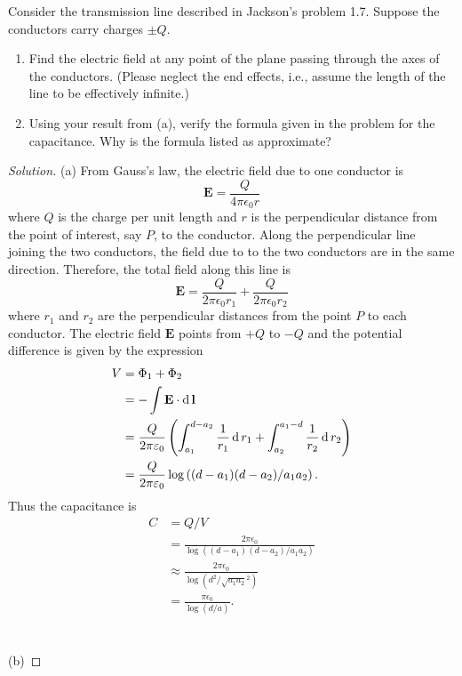 \begin{problem}
Consider the transmission line described in Jackson's problem
1.7. Suppose the conductors carry charges $\pm Q$.
 \begin{enumerate}[noitemsep,label=(\alph*)]
\item Find the electric field at any point of the plane passing
  through the axes of the conductors. (Please neglect the end
  effects, i.e., assume the length of the line to be effectively
  infinite.)
\item Using your result from (a), verify the formula given in the
  problem for the capacitance. Why is the formula listed as
  approximate?
\end{enumerate}
\end{problem}
\begin{proof}[Solution]
(a) From Gauss's law, the electric field due to one conductor is
\begin{equation}
\label{eq:electric-field-conductor}
\textbf{E}=\frac{Q}{4\pi\epsilon_0 r}
\end{equation}
where $Q$ is the charge per unit length and $r$ is the
perpendicular distance from the point of interest, say $P$, to
the conductor. Along the perpendicular line joining the two
conductors, the field due to to the two conductors are in the
same direction. Therefore, the total field along this line is
\begin{equation}
\label{eq:total-electric-field}
\mathbf{E}=\frac{Q}{2\pi\epsilon_0
  r_1}+\frac{Q}{2\pi\epsilon_0 r_2}
\end{equation}
where $r_1$ and $r_2$ are the perpendicular distances from the
point $P$ to each conductor. The electric field $\mathbf{E}$
points from $+Q$ to $-Q$ and the potential difference is given by
the expression
\begin{align*}
V&=\Phi_1+\Phi_2\\
 &=-\int\mathbf{E}\cdot\operatorname{d}\mathbf{l}\\
 &=\frac{Q}{2\pi\varepsilon_0}
   \left(\int_{a_1}^{d-a_2}\frac{1}{r_1}\operatorname{d}
   r_1+\int_{a_2}^{a_1-d}\frac{1}{r_2}\operatorname{d} r_2\right)\\
 &=\frac{Q}{2\pi\varepsilon_0}\log\left((d-a_1)(d-a_2)/a_1a_2\right).
\end{align*}
Thus the capacitance is
\begin{align*}
C&=Q/V\\
 &=\frac{2\pi\epsilon_0}{\log\left((d-a_1)(d-a_2)/a_1a_2\right)}\\
 &\approx
 \frac{2\pi\epsilon_0}{\log\left(d^2/\sqrt{a_1a_2}^2\right)}\\
 &=\frac{\pi\epsilon_0}{\log(d/a)}.
\end{align*}
\\\\
(b)
\end{proof}
\newpage

